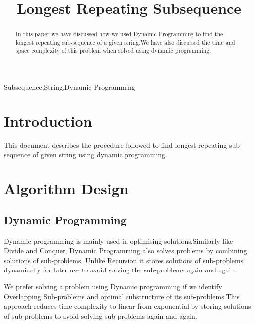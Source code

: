 \documentclass[conference]{IEEEtran}
\begin{document}
\title{Longest Repeating Subsequence \\
}

\author{
\and
{}
\and
{}

}

\maketitle

\begin{abstract}
In this paper we have discussed how we used Dynamic Programming to find the longest repeating sub-sequence of a given string.We have also discussed the time and space complexity of this problem when solved using dynamic programming.
\end{abstract}

\begin{IEEEkeywords}
Subsequence,String,Dynamic Programming
\end{IEEEkeywords}

\section{Introduction}
This document describes the procedure followed to find longest repeating sub-sequence of given string using dynamic programming.

\section{Algorithm Design}

\subsection{Dynamic Programming}

Dynamic programming is mainly used in optimising solutions.Similarly like Divide and Conquer, Dynamic Programming also solves problems by combining solutions of sub-problems. Unlike Recursion it stores solutions of sub-problems dynamically for later use to avoid solving the sub-problems again and again.

We prefer solving a problem using Dynamic programming if we identify Overlapping Sub-problems and optimal substructure of its sub-problems.This approach reduces time complexity to linear from exponential by storing solutions of sub-problems to avoid solving sub-problems again and again.
\end{document}
